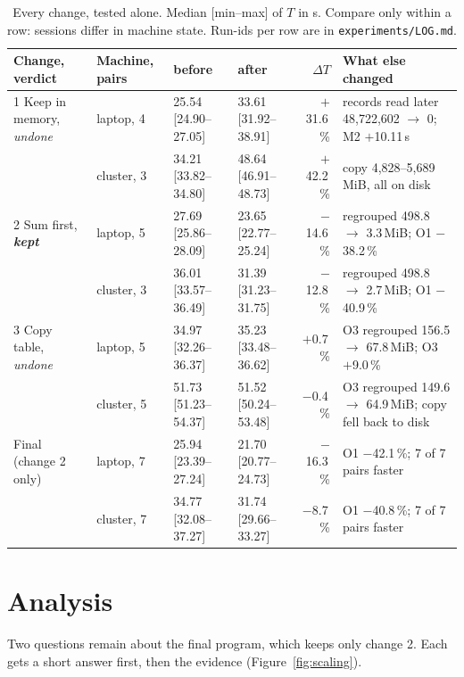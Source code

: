 \documentclass[sigconf]{acmart}
\newcommand{\mib}{\,MiB}
\newcommand{\s}{\,s}
\begin{document}
\begin{table}[t]
\caption{Every change, tested alone. Median [min--max] of $T$ in s. Compare only within a row:
sessions differ in machine state. Run-ids per row are in \texttt{experiments/LOG.md}.}
\label{tab:summary}
\footnotesize
\begin{tabularx}{\textwidth}{@{}llllrX@{}}
\toprule
Change, verdict & Machine, pairs & before & after & $\Delta T$ & What else changed \\
\midrule
1 Keep in memory, \emph{undone} & laptop, 4 & 25.54 [24.90--27.05] & 33.61 [31.92--38.91] & $+$31.6\,\% & records read later 48,722,602 $\to$ 0; M2 $+$10.11\s \\
 & cluster, 3 & 34.21 [33.82--34.80] & 48.64 [46.91--48.73] & $+$42.2\,\% & copy 4,828--5,689\mib, all on disk \\
2 Sum first, \textbf{\emph{kept}} & laptop, 5 & 27.69 [25.86--28.09] & 23.65 [22.77--25.24] & $-$14.6\,\% & regrouped 498.8 $\to$ 3.3\mib; O1 $-$38.2\,\% \\
 & cluster, 3 & 36.01 [33.57--36.49] & 31.39 [31.23--31.75] & $-$12.8\,\% & regrouped 498.8 $\to$ 2.7\mib; O1 $-$40.9\,\% \\
3 Copy table, \emph{undone} & laptop, 5 & 34.97 [32.26--36.37] & 35.23 [33.48--36.62] & $+$0.7\,\% & O3 regrouped 156.5 $\to$ 67.8\mib; O3 $+$9.0\,\% \\
 & cluster, 5 & 51.73 [51.23--54.37] & 51.52 [50.24--53.48] & $-$0.4\,\% & O3 regrouped 149.6 $\to$ 64.9\mib; copy fell back to disk \\
\midrule
Final (change 2 only) & laptop, 7 & 25.94 [23.39--27.24] & 21.70 [20.77--24.73] & $-$16.3\,\% & O1 $-$42.1\,\%; 7 of 7 pairs faster \\
 & cluster, 7 & 34.77 [32.08--37.27] & 31.74 [29.66--33.27] & $-$8.7\,\% & O1 $-$40.8\,\%; 7 of 7 pairs faster \\
\bottomrule
\end{tabularx}
\end{table}

\section{Analysis}

Two questions remain about the final program, which keeps only change 2. Each gets a short
answer first, then the evidence (Figure~\ref{fig:scaling}).
\end{document}
